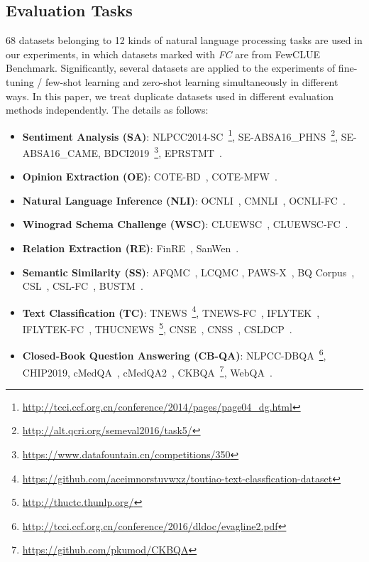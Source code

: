 \subsection{Evaluation Tasks}\label{sec:evaluation-tasks}
68 datasets belonging to 12 kinds of natural language processing tasks are used in our experiments, in which datasets marked with \textit{FC} are from FewCLUE Benchmark. Significantly, several datasets are applied to the experiments of fine-tuning / few-shot learning and zero-shot learning simultaneously in different ways. In this paper, we treat duplicate datasets used in different evaluation methods independently. The details as follows:

\begin{itemize}
\item \textbf{Sentiment Analysis (SA)}: NLPCC2014-SC~\footnote{\url{http://tcci.ccf.org.cn/conference/2014/pages/page04_dg.html}}, SE-ABSA16\_PHNS~\footnote{\url{http://alt.qcri.org/semeval2016/task5/}}, SE-ABSA16\_CAME, BDCI2019~\footnote{\url{https://www.datafountain.cn/competitions/350}},
EPRSTMT~\cite{xu2021fewclue}.
\item \textbf{Opinion Extraction (OE)}: COTE-BD~\cite{li2018cote}, COTE-MFW~\cite{li2018cote}.
\item \textbf{Natural Language Inference (NLI)}: OCNLI~\cite{xu2020clue}, CMNLI~\cite{xu2020clue}, OCNLI-FC~\cite{xu2021fewclue}.  
\item \textbf{Winograd Schema Challenge (WSC)}: CLUEWSC~\cite{xu2020clue}, CLUEWSC-FC~\cite{xu2021fewclue}.
\item \textbf{Relation Extraction (RE)}: FinRE~\cite{li2019finre}, SanWen~\cite{xu2017discourse}.
\item \textbf{Semantic Similarity (SS)}: AFQMC~\cite{xu2020clue}, LCQMC \cite{liu2018lcqmc}, PAWS-X~\cite{yang2019paws}, BQ Corpus~\cite{chen2018bq}, CSL~\cite{xu2020clue}, CSL-FC~\cite{xu2021fewclue}, BUSTM~\cite{xu2021fewclue}. 
\item \textbf{Text Classification (TC)}: TNEWS~\footnote{\url{https://github.com/aceimnorstuvwxz/toutiao-text-classfication-dataset}},
TNEWS-FC~\cite{xu2021fewclue},
IFLYTEK~\cite{co2019iflytek}, IFLYTEK-FC~\cite{xu2021fewclue},
THUCNEWS~\footnote{\url{http://thuctc.thunlp.org/}}, CNSE~\cite{liu2018matching}, CNSS~\cite{liu2018matching}, CSLDCP~\cite{xu2021fewclue}.
\item \textbf{Closed-Book Question Answering (CB-QA)}: NLPCC-DBQA~\footnote{\url{http://tcci.ccf.org.cn/conference/2016/dldoc/evagline2.pdf}}, CHIP2019, cMedQA~\cite{zhang2017cmedqa}, cMedQA2~\cite{zhang2018multi}, CKBQA~\footnote{\url{https://github.com/pkumod/CKBQA}}, WebQA~\cite{li2016webqa}.

\end{itemize}
